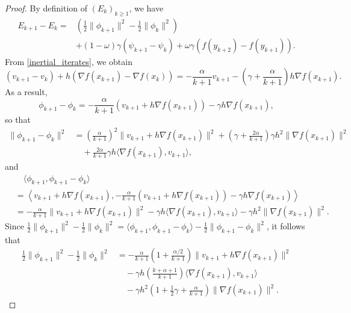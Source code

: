 \documentclass[onefignum,onetabnum]{siamart220329}
\begin{document}
\begin{proof}
By definition of $(E_k)_{k\ge 1}$, we have
\begin{align} \label{E:Energy_diff}
E_{k+1} - E_k = & \left( \frac{1}{2}\| \phi_{k+1} \|^2 - \frac{1}{2}\| \phi_k \|^2 \right) \nonumber \\
& + (1-\omega)\gamma (\psi_{k+1} - \psi_k) + \omega\gamma ( f(y_{k+2}) - f(y_{k+1}) ).    
\end{align}
From \eqref{inertial_iterates}, we obtain
\begin{equation}\label{E: iterates}
( v_{k+1} - v_k ) + h\left( \nabla f(x_{k+1}) - \nabla f(x_k) \right)
= -\frac{\alpha}{k+1} v_{k+1} - \left( \gamma + \frac{\alpha}{k+1} \right) h\nabla f(x_{k+1}).
\end{equation}
As a result,
$$ \phi_{k+1} - \phi_k = -\frac{\alpha}{k+1} \left( v_{k+1} + h\nabla f(x_{k+1}) \right) - \gamma h\nabla f(x_{k+1}), $$
so that
\begin{align*}
\| \phi_{k+1} - \phi_k \|^2 
&= \left( \frac{\alpha}{k+1} \right)^2 \| v_{k+1} + h\nabla f(x_{k+1}) \|^2
  + \left( \gamma + \frac{2\alpha}{k+1} \right)\gamma h^2 \| \nabla f(x_{k+1}) \|^2 \\
&\quad + \frac{2\alpha}{k+1}\gamma h \langle \nabla f(x_{k+1}), v_{k+1} \rangle,
\end{align*}
and
\begin{align*}
&\quad \langle \phi_{k+1}, \phi_{k+1} - \phi_k \rangle \\
&= \left\langle v_{k+1} + h\nabla f(x_{k+1}), -\frac{\alpha}{k+1} \left( v_{k+1} + h\nabla f(x_{k+1}) \right) - \gamma h\nabla f(x_{k+1}) \right\rangle \\
&= -\frac{\alpha}{k+1}\| v_{k+1} + h\nabla f(x_{k+1}) \|^2
   -\gamma h \langle \nabla f(x_{k+1}), v_{k+1} \rangle
   -\gamma h^2 \| \nabla f(x_{k+1}) \|^2.
\end{align*}
Since $\frac{1}{2}\| \phi_{k+1} \|^2 - \frac{1}{2}\| \phi_k \|^2 = \langle \phi_{k+1}, \phi_{k+1} - \phi_k \rangle - \frac{1}{2}\| \phi_{k+1} - \phi_k \|^2$, it follows that
\begin{align}\label{E: phi_diff}
\frac{1}{2}\| \phi_{k+1} \|^2 - \frac{1}{2}\| \phi_k \|^2 
&= -\frac{\alpha}{k+1}\left( 1 + \frac{\alpha/2}{k+1} \right)\| v_{k+1} + h\nabla f(x_{k+1}) \|^2 \nonumber \\
&\quad    -\gamma h\left(\frac{k+\alpha+1}{k+1}\right) \langle \nabla f(x_{k+1}), v_{k+1} \rangle  \nonumber \\
&\quad  -\gamma h^2\left( 1 + \frac{1}{2}\gamma + \frac{\alpha}{k+1} \right) \| \nabla f(x_{k+1}) \|^2.

\end{align}
\end{proof}
\end{document}
